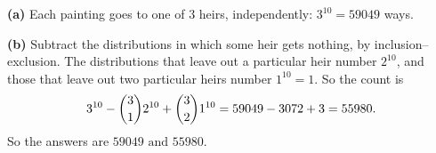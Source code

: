 \textbf{(a)} Each painting goes to one of $3$ heirs, independently: $3^{10}=59049$ ways.

\textbf{(b)} Subtract the distributions in which some heir gets nothing, by inclusion--exclusion. The distributions that leave out a particular heir number $2^{10}$, and those that leave out two particular heirs number $1^{10}=1$. So the count is
\[
3^{10}-\dbinom31 2^{10}+\dbinom32 1^{10}=59049-3072+3=55980 .
\]
So the answers are $\boxed{59049\text{ and }55980}$.

